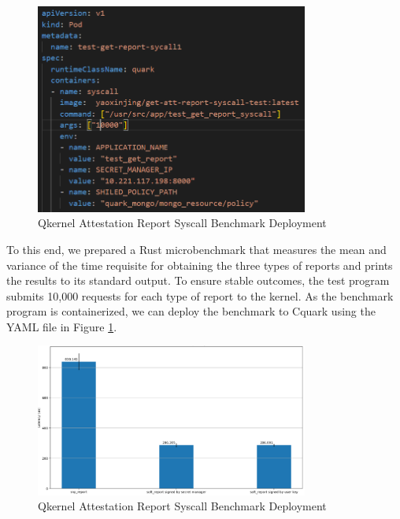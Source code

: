 \begin{figure}[H]
    \centering
    \includegraphics[width=0.8\textwidth]{images/perf_attestation_report_yaml.PNG}
    \caption[Qkernel Attestation Report Syscall Benchmark Deployment]{Qkernel Attestation Report Syscall Benchmark Deployment}
    \label{fig:perf_attestation_report_yaml}
\end{figure}

To this end, we prepared a Rust microbenchmark that measures the mean and variance of the time requisite for obtaining the three types of reports and prints the results to its standard output. To ensure stable outcomes, the test program submits 10,000 requests for each type of report to the kernel. 
As the benchmark program is containerized, we can deploy the benchmark to Cquark using the YAML file in Figure \ref*{fig:perf_attestation_report_yaml}.

\begin{figure}[H]
    \centering
    \includegraphics[width=0.8\textwidth]{images/perf_attestation_report_result.PNG}
    \caption[Benchmark result of Attestation Report Syscall]{Qkernel Attestation Report Syscall Benchmark Deployment}
    \label{fig:perf_attestation_report_result}
\end{figure}

